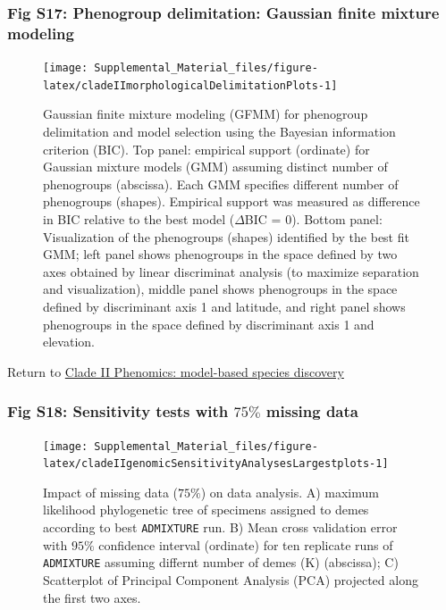 \documentclass[
  11pt,
]{article}
\begin{document}
\hypertarget{fig-s17-phenogroup-delimitation-gaussian-finite-mixture-modeling}{%
\subsubsection{Fig S17: Phenogroup delimitation: Gaussian finite mixture modeling}\label{fig-s17-phenogroup-delimitation-gaussian-finite-mixture-modeling}}

\begin{figure}
\texttt{[image: Supplemental\_Material\_files/figure-latex/cladeIImorphologicalDelimitationPlots-1]} \caption{Gaussian finite mixture modeling (GFMM) for phenogroup delimitation and model selection using the Bayesian information criterion (BIC). Top panel: empirical support (ordinate) for Gaussian mixture models (GMM) assuming distinct number of phenogroups (abscissa). Each GMM specifies different number of phenogroups (shapes). Empirical support was measured as difference in BIC relative to the best model ($\Delta$BIC = $0$). Bottom panel: Visualization of the phenogroups (shapes) identified by the best fit GMM; left panel shows phenogroups in the space defined by two axes obtained by linear discriminat analysis (to maximize separation and visualization), middle panel shows phenogroups in the space defined by discriminant axis 1 and latitude, and right panel shows phenogroups in the space defined by discriminant axis 1 and elevation.}\label{fig:cladeIImorphologicalDelimitationPlots}
\end{figure}

Return to \protect\hyperlink{model-based-species-discovery-2}{Clade II Phenomics: model-based species discovery}
\pagebreak

\hypertarget{fig-s18-sensitivity-tests-with-75-missing-data}{%
\subsubsection{\texorpdfstring{Fig S18: Sensitivity tests with \(75\%\) missing data}{Fig S18: Sensitivity tests with 75\textbackslash\% missing data}}\label{fig-s18-sensitivity-tests-with-75-missing-data}}

\begin{figure}
\texttt{[image: Supplemental\_Material\_files/figure-latex/cladeIIgenomicSensitivityAnalysesLargestplots-1]} \caption{Impact of missing data ($75\%$) on data analysis. A) maximum likelihood phylogenetic tree of specimens assigned to demes according to best \texttt{ADMIXTURE} run. B) Mean cross validation error with $95\%$ confidence interval (ordinate) for ten replicate runs of \texttt{ADMIXTURE} assuming differnt number of demes (K) (abscissa); C) Scatterplot of Principal Component Analysis (PCA) projected along the first two axes.}\label{fig:cladeIIgenomicSensitivityAnalysesLargestplots}
\end{figure}
\end{document}
